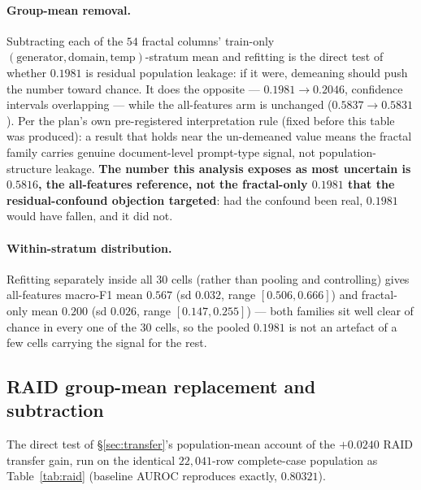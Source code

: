 \documentclass{article}
\begin{document}
\paragraph{Group-mean removal.} Subtracting each of the $54$ fractal columns'
train-only $(\text{generator},\text{domain},\text{temp})$-stratum mean and
refitting is the direct test of whether $0.1981$ is residual population
leakage: if it were, demeaning should push the number toward chance. It does
the opposite --- $0.1981\to0.2046$, confidence intervals overlapping --- while
the all-features arm is unchanged ($0.5837\to0.5831$). Per the plan's own
pre-registered interpretation rule (fixed before this table was produced): a
result that holds near the un-demeaned value means the fractal family carries
genuine document-level prompt-type signal, not population-structure leakage.
\textbf{The number this analysis exposes as most uncertain is $0.5816$, the
all-features reference, not the fractal-only $0.1981$ that the residual-confound
objection targeted}: had the confound been real, $0.1981$ would have fallen,
and it did not.

\paragraph{Within-stratum distribution.} Refitting separately inside all $30$
cells (rather than pooling and controlling) gives all-features macro-F1
mean $0.567$ (sd $0.032$, range $[0.506,0.666]$) and fractal-only mean $0.200$
(sd $0.026$, range $[0.147,0.255]$) --- both families sit well clear of chance
in every one of the $30$ cells, so the pooled $0.1981$ is not an artefact of a
few cells carrying the signal for the rest.

\subsection{RAID group-mean replacement and subtraction}
\label{app:raidgroupmean}

The direct test of \S\ref{sec:transfer}'s population-mean account of the
$+0.0240$ RAID transfer gain, run on the identical $22{,}041$-row complete-case
population as Table~\ref{tab:raid} (baseline AUROC reproduces exactly,
$0.80321$).
\end{document}
